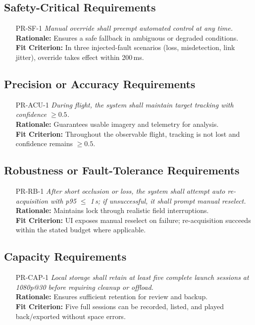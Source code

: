 \documentclass[12pt]{article}
\begin{document}
\subsection{Safety-Critical Requirements}
\begin{itemize}[leftmargin=*]
  \item[PR-SF-1] \emph{Manual override shall preempt automated control at any time.}\\
        \textbf{Rationale:} Ensures a safe fallback in ambiguous or degraded
        conditions.\\ \textbf{Fit Criterion:} In three injected-fault scenarios (loss,
        misdetection, link jitter), override takes effect within 200\,ms.
\end{itemize}

\subsection{Precision or Accuracy Requirements}
\begin{itemize}[leftmargin=*]
  \item[PR-ACU-1] \emph{During flight, the system shall maintain target tracking with
          confidence $\geq 0.5$.}\\ \textbf{Rationale:} Guarantees usable imagery and
        telemetry for analysis.\\ \textbf{Fit Criterion:} Throughout the observable
        flight, tracking is not lost and confidence remains $\geq 0.5$.
\end{itemize}

\subsection{Robustness or Fault-Tolerance Requirements}
\begin{itemize}[leftmargin=*]
  \item[PR-RB-1] \emph{After short occlusion or loss, the system shall attempt auto
          re-acquisition with p95 $\leq$ 1\,s; if unsuccessful, it shall prompt manual
          reselect.}\\ \textbf{Rationale:} Maintains lock through realistic field
        interruptions.\\ \textbf{Fit Criterion:} UI exposes manual reselect on failure;
        re-acquisition succeeds within the stated budget where applicable.
\end{itemize}

\subsection{Capacity Requirements}
\begin{itemize}[leftmargin=*]
  \item[PR-CAP-1] \emph{Local storage shall retain at least five complete launch
          sessions at 1080p@30 before requiring cleanup or offload.}\\
        \textbf{Rationale:} Ensures sufficient retention for review and backup.\\
        \textbf{Fit Criterion:} Five full sessions can be recorded, listed, and played
        back/exported without space errors.
\end{itemize}
\end{document}
